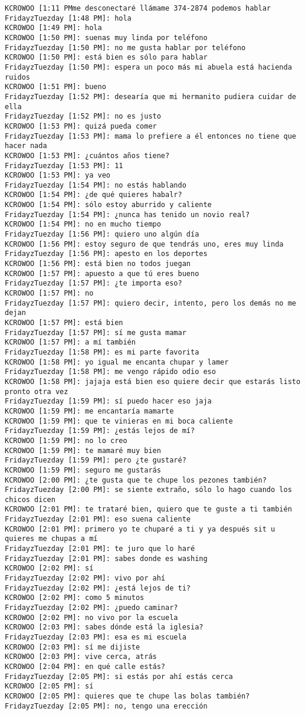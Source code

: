 \begin{verbatim}
KCROWOO [1:11 PMme desconectaré llámame 374-2874 podemos hablar  
FridayzTuezday [1:48 PM]: hola
KCROWOO [1:49 PM]: hola
KCROWOO [1:50 PM]: suenas muy linda por teléfono
FridayzTuezday [1:50 PM]: no me gusta hablar por teléfono
KCROWOO [1:50 PM]: está bien es sólo para hablar
FridayzTuezday [1:50 PM]: espera un poco más mi abuela está hacienda ruidos
KCROWOO [1:51 PM]: bueno
FridayzTuezday [1:52 PM]: desearía que mi hermanito pudiera cuidar de ella
FridayzTuezday [1:52 PM]: no es justo
KCROWOO [1:53 PM]: quizá pueda comer
FridayzTuezday [1:53 PM]: mama lo prefiere a él entonces no tiene que hacer nada
KCROWOO [1:53 PM]: ¿cuántos años tiene?
FridayzTuezday [1:53 PM]: 11
KCROWOO [1:53 PM]: ya veo
FridayzTuezday [1:54 PM]: no estás hablando
KCROWOO [1:54 PM]: ¿de qué quieres habalr?
KCROWOO [1:54 PM]: sólo estoy aburrido y caliente
FridayzTuezday [1:54 PM]: ¿nunca has tenido un novio real?
KCROWOO [1:54 PM]: no en mucho tiempo
FridayzTuezday [1:56 PM]: quiero uno algún día
KCROWOO [1:56 PM]: estoy seguro de que tendrás uno, eres muy linda
FridayzTuezday [1:56 PM]: apesto en los deportes
KCROWOO [1:56 PM]: está bien no todos juegan
KCROWOO [1:57 PM]: apuesto a que tú eres bueno
FridayzTuezday [1:57 PM]: ¿te importa eso?
KCROWOO [1:57 PM]: no
FridayzTuezday [1:57 PM]: quiero decir, intento, pero los demás no me dejan
KCROWOO [1:57 PM]: está bien
FridayzTuezday [1:57 PM]: sí me gusta mamar
KCROWOO [1:57 PM]: a mí también
FridayzTuezday [1:58 PM]: es mi parte favorita
KCROWOO [1:58 PM]: yo igual me encanta chupar y lamer
FridayzTuezday [1:58 PM]: me vengo rápido odio eso
KCROWOO [1:58 PM]: jajaja está bien eso quiere decir que estarás listo pronto otra vez
FridayzTuezday [1:59 PM]: sí puedo hacer eso jaja
KCROWOO [1:59 PM]: me encantaría mamarte
KCROWOO [1:59 PM]: que te vinieras en mi boca caliente
FridayzTuezday [1:59 PM]: ¿estás lejos de mí?
KCROWOO [1:59 PM]: no lo creo
KCROWOO [1:59 PM]: te mamaré muy bien
FridayzTuezday [1:59 PM]: pero ¿te gustaré?
KCROWOO [1:59 PM]: seguro me gustarás
KCROWOO [2:00 PM]: ¿te gusta que te chupe los pezones también?
FridayzTuezday [2:00 PM]: se siente extraño, sólo lo hago cuando los chicos dicen
KCROWOO [2:01 PM]: te trataré bien, quiero que te guste a ti también
FridayzTuezday [2:01 PM]: eso suena caliente
KCROWOO [2:01 PM]: primero yo te chuparé a ti y ya después sit u quieres me chupas a mí
FridayzTuezday [2:01 PM]: te juro que lo haré
FridayzTuezday [2:01 PM]: sabes donde es washing
KCROWOO [2:02 PM]: sí
FridayzTuezday [2:02 PM]: vivo por ahí
FridayzTuezday [2:02 PM]: ¿está lejos de ti?
KCROWOO [2:02 PM]: como 5 minutos
FridayzTuezday [2:02 PM]: ¿puedo caminar?
KCROWOO [2:02 PM]: no vivo por la escuela
KCROWOO [2:03 PM]: sabes dónde está la iglesia?
FridayzTuezday [2:03 PM]: esa es mi escuela
KCROWOO [2:03 PM]: sí me dijiste
KCROWOO [2:03 PM]: vive cerca, atrás
KCROWOO [2:04 PM]: en qué calle estás?
FridayzTuezday [2:05 PM]: si estás por ahí estás cerca
KCROWOO [2:05 PM]: sí
KCROWOO [2:05 PM]: quieres que te chupe las bolas también?
FridayzTuezday [2:05 PM]: no, tengo una erección
\end{verbatim}